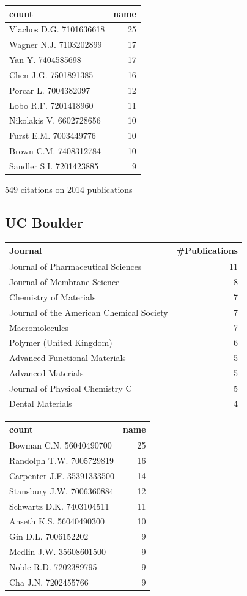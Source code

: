 \documentclass[11pt]{article}
\begin{document}
\begin{center}
\begin{tabular}{lr}
count & name\\
\hline
Vlachos D.G. 7101636618 & 25\\
Wagner N.J. 7103202899 & 17\\
Yan Y. 7404585698 & 17\\
Chen J.G. 7501891385 & 16\\
Porcar L. 7004382097 & 12\\
Lobo R.F. 7201418960 & 11\\
Nikolakis V. 6602728656 & 10\\
Furst E.M. 7003449776 & 10\\
Brown C.M. 7408312784 & 10\\
Sandler S.I. 7201423885 & 9\\
\end{tabular}
\end{center}

549 citations on 2014 publications

\subsection{UC Boulder}
\label{sec-1-9}
\begin{center}
\begin{tabular}{lr}
Journal & \#Publications\\
\hline
Journal of Pharmaceutical Sciences & 11\\
Journal of Membrane Science & 8\\
Chemistry of Materials & 7\\
Journal of the American Chemical Society & 7\\
Macromolecules & 7\\
Polymer (United Kingdom) & 6\\
Advanced Functional Materials & 5\\
Advanced Materials & 5\\
Journal of Physical Chemistry C & 5\\
Dental Materials & 4\\
\end{tabular}
\end{center}

\begin{center}
\begin{tabular}{lr}
count & name\\
\hline
Bowman C.N. 56040490700 & 25\\
Randolph T.W. 7005729819 & 16\\
Carpenter J.F. 35391333500 & 14\\
Stansbury J.W. 7006360884 & 12\\
Schwartz D.K. 7403104511 & 11\\
Anseth K.S. 56040490300 & 10\\
Gin D.L. 7006152202 & 9\\
Medlin J.W. 35608601500 & 9\\
Noble R.D. 7202389795 & 9\\
Cha J.N. 7202455766 & 9\\
\end{tabular}
\end{center}
\end{document}
